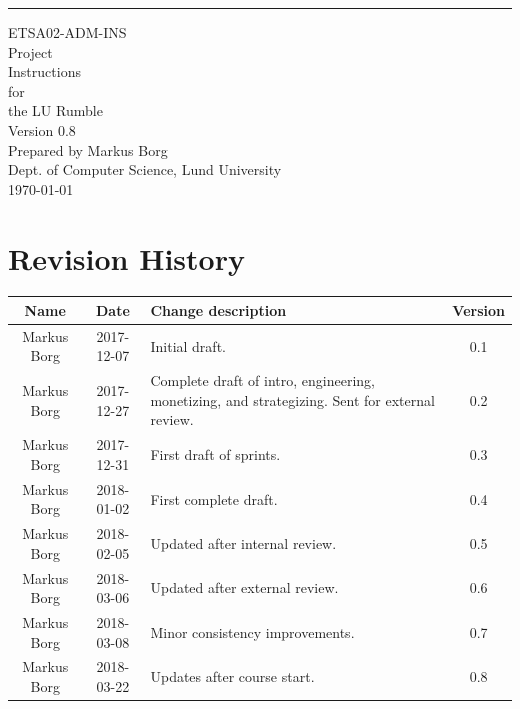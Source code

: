 \documentclass{scrreprt}
\date{}
\def\myversion{0.8 }
\begin{document}
\begin{flushright}
    \rule{16cm}{5pt}\vskip1cm
    \begin{bfseries}
    	\LARGE{ETSA02-ADM-INS}\\
    	\vspace{1.5cm}
        \Huge{Project\\ Instructions}\\
        \vspace{0.5cm}
        for\\
        \vspace{0.5cm}
        the LU Rumble\\
        \vspace{1.5cm}
        \LARGE{Version \myversion}\\ %
        \vspace{1.5cm}
        Prepared by Markus Borg\\
        Dept. of Computer Science, Lund University\\
        \vspace{1.5cm}
        \today\\
    \end{bfseries}
\end{flushright}

\tableofcontents


\chapter*{Revision History}

\begin{center}
    \begin{tabular}{|c|c|p{8cm}|c|}
        \hline
	    Name & Date & Change description & Version\\
        \hline
	    Markus Borg & 2017-12-07 & Initial draft. & 0.1\\
        \hline
        Markus Borg & 2017-12-27 & Complete draft of intro, engineering, monetizing, and strategizing. Sent for external review. & 0.2\\
        \hline
        Markus Borg & 2017-12-31 & First draft of sprints. & 0.3\\
        \hline
        Markus Borg & 2018-01-02 & First complete draft. & 0.4\\
        \hline
        Markus Borg & 2018-02-05 & Updated after internal review. & 0.5\\
        \hline
        Markus Borg & 2018-03-06 & Updated after external review. & 0.6\\
        \hline
        Markus Borg & 2018-03-08 & Minor consistency improvements. & 0.7\\
        \hline
        Markus Borg & 2018-03-22 & Updates after course start. & 0.8\\
        \hline
    \end{tabular}
\end{center}
\end{document}
